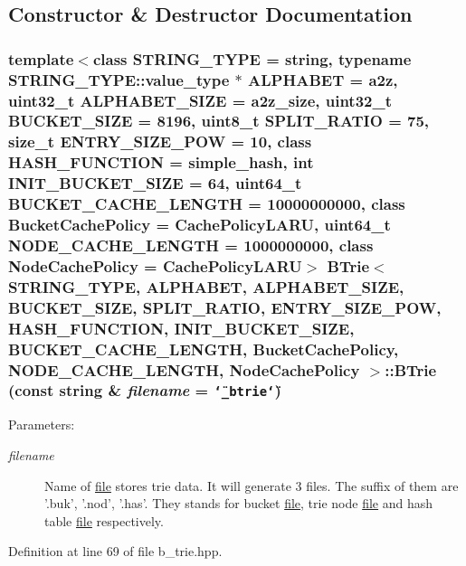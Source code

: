 \subsection{Constructor \& Destructor Documentation}
\hypertarget{classBTrie_3cc0735f4735169d28c2fdc3c052ad7f}{
\subsubsection[{BTrie}]{\setlength{\rightskip}{0pt plus 5cm}template$<$class STRING\_\-TYPE  = string, typename STRING\_\-TYPE::value\_\-type $\ast$ ALPHABET = a2z, uint32\_\-t ALPHABET\_\-SIZE = a2z\_\-size, uint32\_\-t BUCKET\_\-SIZE = 8196, uint8\_\-t SPLIT\_\-RATIO = 75, size\_\-t ENTRY\_\-SIZE\_\-POW = 10, class HASH\_\-FUNCTION  = simple\_\-hash, int INIT\_\-BUCKET\_\-SIZE = 64, uint64\_\-t BUCKET\_\-CACHE\_\-LENGTH = 10000000000, class BucketCachePolicy  = CachePolicyLARU, uint64\_\-t NODE\_\-CACHE\_\-LENGTH = 1000000000, class NodeCachePolicy  = CachePolicyLARU$>$ {\bf BTrie}$<$ STRING\_\-TYPE, ALPHABET, ALPHABET\_\-SIZE, BUCKET\_\-SIZE, SPLIT\_\-RATIO, ENTRY\_\-SIZE\_\-POW, HASH\_\-FUNCTION, INIT\_\-BUCKET\_\-SIZE, BUCKET\_\-CACHE\_\-LENGTH, BucketCachePolicy, NODE\_\-CACHE\_\-LENGTH, NodeCachePolicy $>$::{\bf BTrie} (const string \& {\em filename} = {\tt \char`\"{}\_\-btrie\char`\"{}})}}
\label{classBTrie_3cc0735f4735169d28c2fdc3c052ad7f}


\begin{Desc}
\item[Parameters:]
\begin{description}
\item[{\em filename}]Name of \hyperlink{classfile}{file} stores trie data. It will generate 3 files. The suffix of them are '.buk', '.nod', '.has'. They stands for bucket \hyperlink{classfile}{file}, trie node \hyperlink{classfile}{file} and hash table \hyperlink{classfile}{file} respectively. \end{description}
\end{Desc}


Definition at line 69 of file b\_\-trie.hpp.

